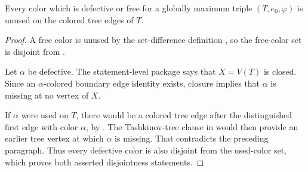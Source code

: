 \begin{lemma}
Every color which is defective or free for a globally maximum triple
$(T,e_0,\varphi)$ is unused on the colored tree edges of $T$.
\end{lemma}
\begin{proof}
A free color is unused by the set-difference definition
, so the free-color set is disjoint from
.

Let $\alpha$ be defective.  The statement-level package
 says that $X=V(T)$ is closed.  Since an
$\alpha$-colored boundary edge identity exists, closure implies that
$\alpha$ is missing at no vertex of $X$.

If $\alpha$ were used on $T$, there would be a colored tree edge after the
distinguished first edge with color $\alpha$, by
.  The Tashkinov-tree clause in
 would then provide an earlier tree vertex at
which $\alpha$ is missing.  That contradicts the preceding paragraph.
Thus every defective color is also disjoint from the used-color set, which
proves both asserted disjointness statements.
\end{proof}
